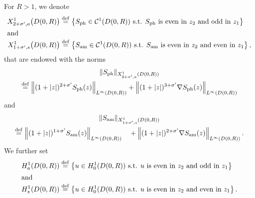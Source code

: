 \documentclass[10pt]{amsart}
\theoremstyle{definition}\newtheorem{defi}[theo]{Definition}\newtheorem{rema}[theo]{Remark}\newtheorem{exam}[theo]{Example}\newtheorem{exem}[theo]{Example}\newtheorem{nota}[theo]{Notation}
\newcommand*\ddef{\stackrel{\rm def}{=}}
\newcommand{\amm}{\mathrm{am}}
\newcommand{\phl}{\mathrm{ph}}
\newcommand*\BC{\mathcal{C}}
\newcommand*\ii{\infty}
\newcommand*\s{\sigma}
\begin{document}
For $ R > 1$, we denote
\begin{align*}
X^{1}_{2+\s', a} \big(D(0,R) \big)
&\ddef \left\{ S_{\phl} \in \BC^1 (D(0,R)) \text{ s.t. } S_{\phl} \text{ is even in } z_2
\text{ and odd in } z_1 \right\}
\\
\intertext{and}
X^{1}_{1+\s', s} \big(D(0,R) \big)
&\ddef \left\{ S_{\amm} \in \BC^1 (D(0,R)) \text{ s.t. } S_{\amm} \text{ is even in } z_2
\text{ and even in } z_1 \right\},
\end{align*}
that are endowed with the norms
\begin{multline*}
\| S_{\phl} \|_{ X^{1}_{2+\s', a} (D(0,R)) }\\  \ddef
\left\| (1 + |z|)^{2+\s'} S_{\phl} (z)\right\|_{ L^\ii (D(0,R)) }
+ \left\| (1 + |z|)^{3+\s'} \nabla S_{\phl}(z) \right\|_{ L^\ii (D(0,R)) }
\end{multline*}
and
\begin{multline*}
\| S_{\amm} \|_{ X^{1}_{1+\s', s} (D(0,R)) } \\  \ddef
\left\| (1 + |z|)^{1+\s'} S_{\amm} (z)\right\|_{ L^\ii (D(0,R)) }
 \quad + \left\| (1 + |z|)^{2+\s'} \nabla S_{\amm}(z) \right\|_{ L^\ii (D(0,R)) }.
\end{multline*}
We further set
\begin{align*}
H^{1}_a (D(0,R)) &\ddef \left\{ u \in H^{1}_0 (D(0,R)) \text{ s.t. } u \text{ is even in } z_2
\text{ and odd in } z_1 \right\}
\\
\intertext{and}
H^{1}_s (D(0,R)) &\ddef \left\{ u \in H^{1}_0 (D(0,R)) \text{ s.t. } u \text{ is even in } z_2
\text{ and even in } z_1 \right\}.
\end{align*}
\end{document}
